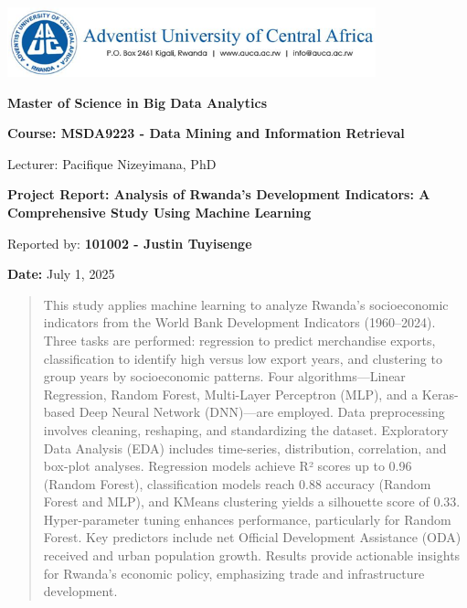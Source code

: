 \documentclass[12pt]{article}
\begin{document}
	
	\begin{titlepage}
		\centering
		\vspace*{2cm}
		\includegraphics[width=0.8\textwidth]{../auca.png}\par
		\vspace{1cm}
		{\LARGE \textbf{Master of Science in Big Data Analytics}}\par
		\vspace{1.5cm}
		{\Large \textbf{Course: MSDA9223 - Data Mining and Information Retrieval}}\par
		\vspace{0.3cm}
		{\large Lecturer: Pacifique Nizeyimana, PhD}\par
		\vspace{1.5cm}
		{\huge \textbf{Project Report: Analysis of Rwanda's Development Indicators: A Comprehensive Study Using Machine Learning}}\par
		\vspace{1.5cm}
		{\large Reported by: \textbf{101002 - Justin Tuyisenge}}\par
		\vspace{2cm}
		{\large \textbf{Date:} July 1, 2025}\par
	\end{titlepage}
	
	\begin{abstract}
		This study applies machine learning to analyze Rwanda's socioeconomic indicators from the World Bank Development Indicators (1960–2024). Three tasks are performed: regression to predict merchandise exports, classification to identify high versus low export years, and clustering to group years by socioeconomic patterns. Four algorithms—Linear Regression, Random Forest, Multi-Layer Perceptron (MLP), and a Keras-based Deep Neural Network (DNN)—are employed. Data preprocessing involves cleaning, reshaping, and standardizing the dataset. Exploratory Data Analysis (EDA) includes time-series, distribution, correlation, and box-plot analyses. Regression models achieve R² scores up to 0.96 (Random Forest), classification models reach 0.88 accuracy (Random Forest and MLP), and KMeans clustering yields a silhouette score of 0.33. Hyper-parameter tuning enhances performance, particularly for Random Forest. Key predictors include net Official Development Assistance (ODA) received and urban population growth. Results provide actionable insights for Rwanda's economic policy, emphasizing trade and infrastructure development.
	\end{abstract}
	
\end{document}
